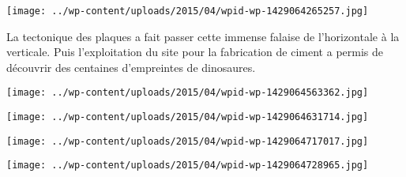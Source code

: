  

\begin{center} \texttt{[image: ../wp-content/uploads/2015/04/wpid-wp-1429064265257.jpg]} \end{center}



 La tectonique des plaques a fait passer cette immense falaise de l'horizontale à la verticale. Puis l'exploitation du site pour la fabrication de ciment a permis de découvrir des centaines d'empreintes de dinosaures. 

 

\begin{center} \texttt{[image: ../wp-content/uploads/2015/04/wpid-wp-1429064563362.jpg]} \end{center}



 

\begin{center} \texttt{[image: ../wp-content/uploads/2015/04/wpid-wp-1429064631714.jpg]} \end{center}



 

\begin{center} \texttt{[image: ../wp-content/uploads/2015/04/wpid-wp-1429064717017.jpg]} \end{center}



 

\begin{center} \texttt{[image: ../wp-content/uploads/2015/04/wpid-wp-1429064728965.jpg]} \end{center}




 
 
